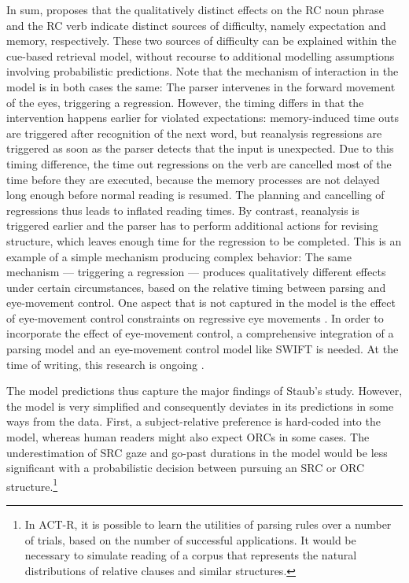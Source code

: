 \documentclass{cambridge7A}\usepackage[]{graphicx}\usepackage[]{color}
\begin{document}
In sum, \cite{Staub2010a} proposes that the qualitatively distinct effects on the RC noun phrase and the RC verb indicate distinct sources of difficulty, namely expectation and memory, respectively. These two sources of difficulty can be explained within the cue-based retrieval model, without recourse to additional modelling assumptions involving  probabilistic predictions. Note that the mechanism of interaction in the model is in both cases the same: The parser intervenes in the forward movement of the eyes, triggering a regression. However, the timing differs in that the intervention happens earlier for violated expectations: memory-induced time outs are triggered after recognition of the next word, but reanalysis regressions are triggered as soon as the parser detects that the input is unexpected. Due to this timing difference, the time out regressions on the verb are cancelled most of the time before they are executed, because the memory processes are not delayed long enough before normal reading is resumed. The planning and cancelling of regressions thus leads to inflated reading times. By contrast, reanalysis is triggered earlier and the parser has to perform additional actions for revising structure, which leaves enough time for the regression to be completed. 
This is an example of a simple mechanism producing complex behavior: The same mechanism --- triggering a regression ---  produces qualitatively different effects under certain circumstances, based on the relative timing between parsing and eye-movement control. One aspect that is not captured in the model is the effect of eye-movement control constraints on regressive eye movements \citep{EngbertNuthmannRichter2005}. In order to incorporate the effect of eye-movement control, a comprehensive integration of a parsing model and an eye-movement control model like SWIFT is needed. At the time of writing, this research is ongoing \citep{Rabe2019}.

The model predictions thus capture the major findings of Staub's study. However, the model is very simplified and consequently deviates in its predictions in some ways from the data.
First, a subject-relative preference is hard-coded into the model, whereas human readers might also expect ORCs in some cases. The underestimation of SRC gaze and go-past durations in the model would be less significant with a probabilistic decision between pursuing an SRC or ORC structure.\footnote{In ACT-R, it is possible to learn the utilities of parsing rules over a number of trials, based on the number of successful applications. It would be necessary to simulate reading of a corpus that represents the natural distributions of relative clauses and similar structures.}
\end{document}
